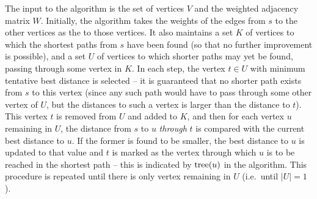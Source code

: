 The input to the algorithm is the set of vertices $V$ and the weighted adjacency matrix $W$. Initially, the algorithm takes the weights of the edges from $s$ to the other vertices as the  to those vertices. It also maintains a set $K$ of vertices to which the shortest paths from $s$ have been found (so that no further improvement is possible), and a set $U$ of vertices to which shorter paths may yet be found, passing through some vertex in $K$. In each step, the vertex $t \in U$ with minimum tentative best distance is selected -- it is guaranteed that no shorter path exists from $s$ to this vertex (since any such path would have to pass through some other vertex of $U$, but the distances to such a vertex is larger than the distance to $t$). This vertex $t$ is removed from $U$ and added to $K$, and then for each vertex $u$ remaining in $U$, the distance from $s$ to $u$ \emph{through} $t$ is compared with the current best distance to $u$. If the former is found to be smaller, the best distance to $u$ is updated to that value and $t$ is marked as the vertex through which $u$ is to be reached in the shortest path -- this is indicated by $\operatorname{tree}(u)$ in the algorithm. This procedure is repeated until there is only vertex remaining in $U$ (i.e.\ until $|U| = 1$).


